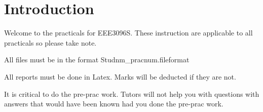 \section*{Introduction}
Welcome to the practicals for EEE3096S. These instruction are applicable to all practicals so please take note.

All files must be in the format Studnm\_pracnum.fileformat

All reports must be done in Latex. Marks will be deducted if they are not.

It is critical to do the pre-prac work. Tutors will not help you with questions with answers that would have been known had you done the pre-prac work.







